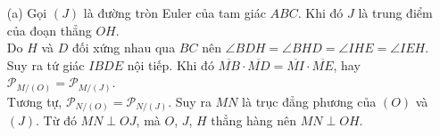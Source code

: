     \begin{solution}
        \hfill
        \begin{itemize}
            \item[(a)] Gọi \((J)\) là đường tròn Euler của tam giác \(ABC\). Khi đó \(J\) là trung điểm của đoạn thẳng \(OH\).\\
            Do \(H\) và \(D\) đối xứng nhau qua \(BC\) nên \(\angle BDH = \angle BHD = \angle IHE = \angle IEH\). Suy ra tứ giác \(IBDE\) nội tiếp. Khi đó \(\overline{MB} \cdot \overline{MD} = \overline{MI} \cdot \overline{ME}\), hay \(\mathcal{P}_{M/(O)} = \mathcal{P}_{M/(J)}\).\\
            Tương tự, \(\mathcal{P}_{N/(O)} = \mathcal{P}_{N/(J)}\). Suy ra \(MN\) là trục đẳng phương của \((O)\) và \((J)\). Từ đó \(MN \perp OJ\), mà \(O\), \(J\), \(H\) thẳng hàng nên \(MN \perp OH\).


\end{itemize}
\end{solution}
